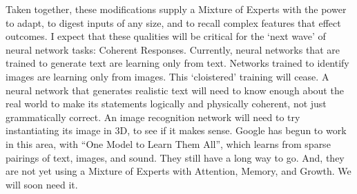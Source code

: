 Taken together, these modifications supply a Mixture of Experts with the power to adapt, to digest inputs of any size, and to recall complex features that effect outcomes. I expect that these qualities will be critical for the ‘next wave’ of neural network tasks: Coherent Responses. Currently, neural networks that are trained to generate text are learning only from text. Networks trained to identify images are learning only from images. This ‘cloistered’ training will cease. A neural network that generates realistic text will need to know enough about the real world to make its statements logically and physically coherent, not just grammatically correct. An image recognition network will need to try instantiating its image in 3D, to see if it makes sense. Google has begun to work in this area, with “One Model to Learn Them All”, which learns from sparse pairings of text, images, and sound. They still have a long way to go. And, they are not yet using a Mixture of Experts with Attention, Memory, and Growth. We will soon need it.
